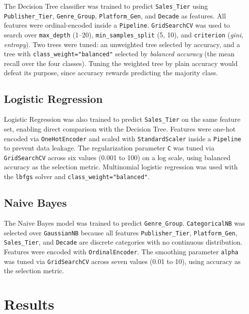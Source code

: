 \documentclass[sigconf]{acmart}
\begin{document}
The Decision Tree classifier was trained to predict \texttt{Sales\_Tier} using \texttt{Publisher\_Tier}, \texttt{Genre\_Group},
\texttt{Platform\_Gen}, and \texttt{Decade} as features. All features were ordinal-encoded inside a \texttt{Pipeline}. \texttt{GridSearchCV} was used to search over \texttt{max\_depth}
(1--20), \texttt{min\_samples\_split} (5, 10), and \texttt{criterion} (\textit{gini}, \textit{entropy}). Two trees were tuned: an unweighted
tree selected by accuracy, and a tree with \texttt{class\_weight="balanced"} selected by \emph{balanced accuracy} (the mean recall over the
four classes). Tuning the weighted tree by plain accuracy would defeat its purpose, since accuracy rewards predicting the majority class.

\subsection{Logistic Regression}

Logistic Regression was also trained to predict \texttt{Sales\_Tier} on the same feature set, enabling direct comparison with the Decision
Tree. Features were one-hot encoded via \texttt{OneHotEncoder} and scaled with \texttt{StandardScaler} inside a \texttt{Pipeline} to
prevent data leakage. The regularization parameter \texttt{C} was tuned via \texttt{GridSearchCV} across six values (0.001 to 100) on a
log scale, using balanced accuracy as the selection metric. Multinomial logistic regression was used with the \texttt{lbfgs} solver and
\texttt{class\_weight="balanced"}.

\subsection{Naive Bayes}

The Naive Bayes model was trained to predict \texttt{Genre\_Group}. \texttt{CategoricalNB} was selected over \texttt{GaussianNB} because
all features \texttt{Publisher\_Tier}, \texttt{Platform\_Gen}, \texttt{Sales\_Tier}, and \texttt{Decade} are discrete categories
with no continuous distribution. Features were encoded with \texttt{OrdinalEncoder}. The smoothing parameter \texttt{alpha} was
tuned via \texttt{GridSearchCV} across seven values (0.01 to 10), using accuracy as the selection metric.

\section{Results}
\end{document}
